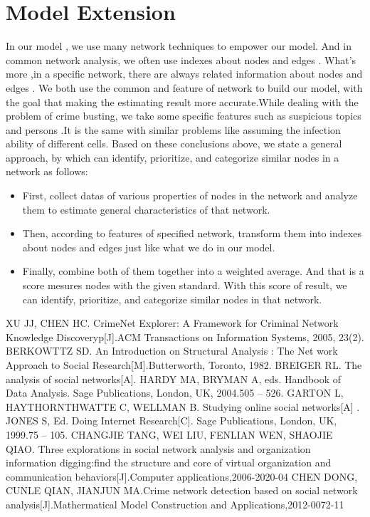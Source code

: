 \documentclass[12pt]{article}
\begin{document}
\section{Model Extension}
In our model , we use many network techniques to empower our model. And in common network analysis, we often use indexes about nodes and edges . What’s more ,in a specific network, there are always related information about nodes and edges . We both use the common and feature of network to build our model, with the goal that making the estimating result more accurate.While dealing with the problem of crime busting, we take some specific features such as suspicious topics and persons .It is the same with similar problems like assuming the infection ability of different cells.
Based on these conclusions above, we state a general approach, by which can identify, prioritize, and categorize similar nodes in a network as follows: 
\begin{itemize}
\item First, collect datas of various properties of nodes in the network and analyze them to estimate general characteristics of that network. 

\item Then, according to features of specified network, transform them into indexes about nodes and edges just like what we do in our model. 

\item Finally, combine both of them together into a weighted average. And that is a score mesures nodes with the given standard. With this score of result, we can identify, prioritize, and categorize similar nodes in that network.
\end{itemize} 


\begin{thebibliography}{99}
XU JJ, CHEN HC. CrimeNet Explorer: A Framework for Criminal Network Knowledge Discoveryp[J].ACM Transactions on Information Systems, 2005, 23(2).
BERKOWTTZ SD. An Introduction on Structural Analysis : The Net work Approach to Social Research[M].Butterworth, Toronto, 1982.
BREIGER RL. The analysis of social networks[A]. HARDY MA, BRYMAN A, eds. Handbook of Data Analysis. Sage Publications, London, UK, 2004.505 – 526.
GARTON L, HAYTHORNTHWATTE C, WELLMAN B. Studying online social networks[A] . JONES S, Ed. Doing Internet Research[C]. Sage Publications, London, UK, 1999.75 – 105.
CHANGJIE TANG, WEI LIU, FENLIAN WEN, SHAOJIE QIAO. Three explorations in social network analysis and organization information digging:find the structure and core of virtual organization and communication behaviors[J].Computer applications,2006-2020-04
CHEN DONG, CUNLE QIAN, JIANJUN MA.Crime network detection based on social network analysis[J].Mathermatical Model Construction and Applications,2012-0072-11
\end{thebibliography}
\end{document}
